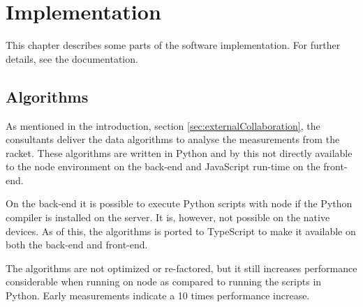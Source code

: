 \chapter{Implementation}
This chapter describes some parts of the software implementation.
For further details, see the documentation.

\section{Algorithms}
As mentioned in the introduction, section \ref{sec:externalCollaboration}, the consultants deliver the data algorithms to analyse the measurements from the racket.
These algorithms are written in Python and by this not directly available to the \gls{node} environment on the back-end and JavaScript run-time on the front-end.

On the back-end it is possible to execute Python scripts with \gls{node} if the Python compiler is installed on the server.
It is, however, not possible on the native devices.
As of this, the algorithms is ported to TypeScript to make it available on both the back-end and front-end.

The algorithms are not optimized or re-factored, but it still increases performance considerable when running on \gls{node} as compared to running the scripts in Python.
Early measurements indicate a 10 times performance increase.
